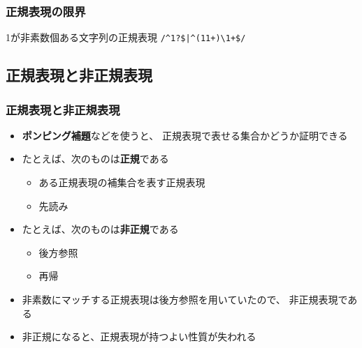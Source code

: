 \documentclass[12pt, unicode, svgnames, handout]{beamer}
\begin{document}
\begin{frame}[fragile]
  \frametitle{正規表現の限界}

  \begin{block}{1が非素数個ある文字列の正規表現}
    \centering
    \LARGE
    \lstinline{/^1?$|^(11+)\1+$/}
  \end{block}

\end{frame}

\subsection{正規表現と非正規表現}
\begin{frame}[fragile]
  \frametitle{正規表現と非正規表現}

  \begin{itemize}
    \item<2-> \textbf{ポンピング補題}などを使うと、
      正規表現で表せる集合かどうか証明できる
    \item<3-> たとえば、次のものは\textbf{正規}である
      \begin{itemize}
        \item ある正規表現の補集合を表す正規表現
        \item 先読み
      \end{itemize}
    \item<4-> たとえば、次のものは\textbf{非正規}である
      \begin{itemize}
        \item 後方参照
        \item 再帰
      \end{itemize}
    \item<5-> 非素数にマッチする正規表現は後方参照を用いていたので、
      非正規表現である
    \item<6-> 非正規になると、正規表現が持つよい性質が失われる
  \end{itemize}
\end{frame}
\end{document}
